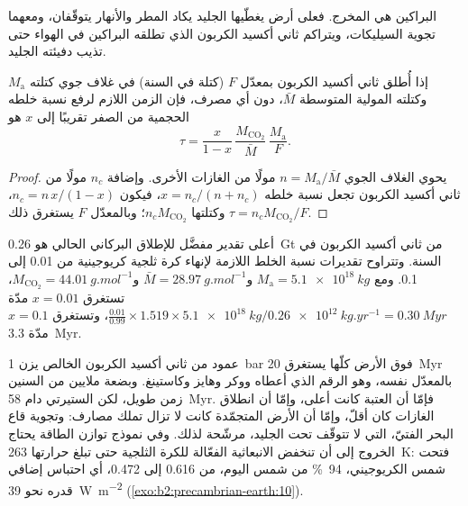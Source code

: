 البراكين هي المخرج. فعلى أرض يغطّيها الجليد يكاد المطر والأنهار يتوقّفان، ومعهما تجوية
السيليكات، ويتراكم ثاني أكسيد الكربون الذي تطلقه البراكين في الهواء
حتى تذيب دفيئته الجليد.

\begin{proposition}\label{prop:b2:precambrian-earth:co2}
إذا أُطلق ثاني أكسيد الكربون بمعدّل $F$ (كتلة في السنة) في غلاف جوي كتلته
$M_{\text{a}}$ وكتلته المولية المتوسطة $\bar M$، دون أي مصرف، فإن الزمن اللازم لرفع نسبة خلطه
الحجمية من الصفر تقريبًا إلى $x$ هو
\[
  \tau = \frac{x}{1 - x}\,\frac{M_{\mathrm{CO_2}}}{\bar M}\,\frac{M_{\text{a}}}{F} .
\]
\end{proposition}

\begin{proof}
يحوي الغلاف الجوي $n = M_{\text{a}}/\bar M$ مولًا من الغازات الأخرى. وإضافة $n_c$ مولًا من
ثاني أكسيد الكربون تجعل نسبة خلطه $x = n_c/(n + n_c)$، فيكون $n_c = n\,x/(1 - x)$، وكتلتها
$n_c M_{\mathrm{CO_2}}$؛ وبالمعدّل $F$ يستغرق ذلك $\tau = n_c M_{\mathrm{CO_2}}/F$.
\end{proof}

\begin{example}\label{ex:b2:precambrian-earth:escape}
أعلى تقدير مفضَّل للإطلاق البركاني الحالي هو \qty{0.26}{Gt} من ثاني أكسيد
الكربون في السنة. وتتراوح تقديرات
نسبة الخلط اللازمة لإنهاء كرة ثلجية كريوجينية من 0.01 إلى 0.1. ومع $M_{\text{a}} =
\qty{5.1e18}{kg}$ و$\bar M = \qty{28.97}{g.mol^{-1}}$ و$M_{\mathrm{CO_2}} =
\qty{44.01}{g.mol^{-1}}$، تستغرق $x = 0.01$ مدّة $\frac{0.01}{0.99}\times1.519\times\qty{5.1e18}{kg}
/ \qty{0.26e12}{kg.yr^{-1}} = \qty{0.30}{Myr}$، وتستغرق $x = 0.1$ مدّة \qty{3.3}{Myr}.
\end{example}

عمود من ثاني أكسيد الكربون الخالص يزن \qty{1}{bar} فوق الأرض كلّها يستغرق
\qty{20}{Myr} بالمعدّل نفسه، وهو الرقم الذي أعطاه ووكر وهايز وكاستينغ. وبضعة ملايين من السنين
زمن طويل، لكن الستيرتي دام \qty{58}{Myr}. فإمّا أن العتبة كانت أعلى، وإمّا أن
انطلاق الغازات كان أقلّ، وإمّا أن الأرض المتجمّدة كانت لا تزال تملك مصارف: وتجوية قاع البحر الفتيّ،
التي لا تتوقّف تحت الجليد، مرشّحة لذلك. وفي نموذج توازن الطاقة يحتاج الخروج إلى
أن تنخفض الانبعاثية الفعّالة للكرة الثلجية حتى تبلغ حرارتها \qty{263}{K}: فتحت
شمس الكريوجيني، \qty{94}{\percent} من شمس اليوم، من 0.616 إلى 0.472، أي احتباس إضافي قدره
نحو \qty{39}{W.m^{-2}} (\cref{exo:b2:precambrian-earth:10}).

